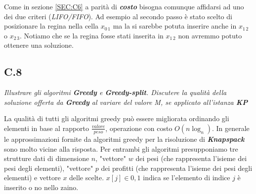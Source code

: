\documentclass[a4paper]{article}
\newcommand{\imp}[1]{\textbf{\textit{#1}}}
\begin{document}
Come in sezione \ref{SEC:C6} a parità di \imp{costo} bisogna comunque affidarsi ad uno dei due criteri (\textit{LIFO/FIFO}).
Ad esempio al secondo passo è stato scelto di posizionare la regina nella cella $x_{0 \, 1}$ ma la si sarebbe potuta inserire anche in $x_{1 \, 2}$ o $x_{2 \, 3}$.
Notiamo che se la regina fosse stati inserita in $x_{1 \, 2}$ non avremmo potuto ottenere una soluzione. 
\subsection{C.8}
\emph{Illustrare gli algoritmi \textbf{Greedy} e \textbf{Greedy-split}. Discutere la qualità della soluzione offerta da \textbf{Greedy} al variare del valore M, se applicato all’istanza \textbf{KP}}


La qualità di tutti gli algoritmi greedy può essere migliorata ordinando gli elementi in base al rapporto $\frac{valore}{peso}$, operazione con costo $O(n\log_n)$.
In generale le approssimazioni fornite da algoritmi greedy per la risoluzione di \imp{Knapspack} sono molto vicine alla risposta. %
Per entrambi gli algoritmi presupponiamo tre strutture dati di dimensione $n$, "vettore" $w$ dei pesi (che rappresenta l'isieme dei pesi degli elementi), "vettore" $p$ dei profitti  (che rappresenta l'isieme dei pesi degli elementi) e vettore $x$ delle scelte. $x[j] \in {0,1}$ indica se l'elemento di indice $j$ è inserito o no nello zaino.
\end{document}
